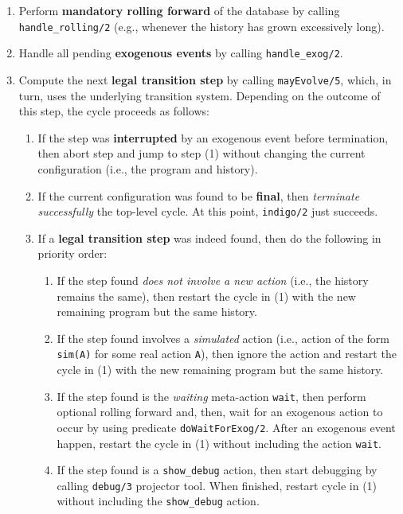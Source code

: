 \documentclass[11pt]{article}
\begin{document}
\begin{enumerate}
\item Perform \textbf{mandatory rolling forward} of the database by
calling \texttt{handle\_rolling/2} (e.g., whenever the history has grown
excessively long).

\item Handle all pending \textbf{exogenous events} by calling
\texttt{handle\_exog/2}.
  
\item Compute the next \textbf{legal transition step} by calling
\texttt{mayEvolve/5}, which, in turn, uses the underlying transition system.
Depending on the outcome of this step, the cycle proceeds as follows:

\begin{enumerate}
\item If the step was \textbf{interrupted} by an exogenous event before
termination, then abort step and jump to step (1) without changing the current
configuration (i.e., the program and history).
    
\item If the current configuration was found to be \textbf{final}, then
\emph{terminate successfully} the top-level cycle. At this point,
\texttt{indigo/2} just succeeds.
       
\item If a \textbf{legal transition step} was indeed found, then do the
following in priority order:
%
\begin{enumerate}
\item If the step found \textit{does not involve a new action} (i.e., the
history remains the same), then restart the cycle in (1) with the new remaining
program but the same history.
         
\item If the step found involves a \emph{simulated} action (i.e., action
of the form \texttt{sim(A)} for some real action \texttt{A}), then ignore the
action and restart the cycle in (1) with the new remaining program but the same
history.
      
\item If the step found is the \emph{waiting} meta-action \texttt{wait}, then
perform optional rolling forward and, then, wait for an exogenous action to
occur by using predicate \texttt{doWaitForExog/2}. After an exogenous event
happen, restart the cycle in (1) without including the action \texttt{wait}.
      
\item If the step found is a \texttt{show\_debug} action, then start
debugging by calling \texttt{debug/3} projector tool. When finished,
restart cycle in (1) without including the \texttt{show\_debug} action.
    

\end{enumerate}
\end{enumerate}
\end{enumerate}
\end{document}
